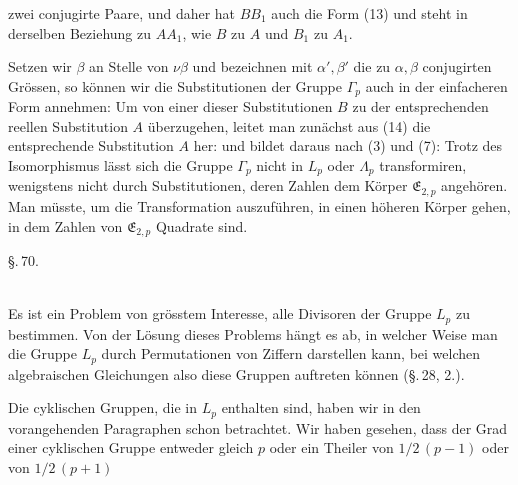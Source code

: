 zwei conjugirte Paare, und daher hat $BB_1$ auch die Form (13) und steht in derselben Beziehung zu $AA_1$, wie $B$ zu $A$ und $B_1$ zu $A_1$.


Setzen wir $\beta$ an Stelle von $\nu\beta$ und bezeichnen mit $\alpha', \beta'$ die zu $\alpha, \beta$ conjugirten Grössen, so können wir die Substitutionen der Gruppe $\Gamma_p$ auch in der einfacheren Form annehmen:
Um von einer dieser Substitutionen $B$ zu der entsprechenden reellen Substitution $A$ überzugehen, leitet man zunächst aus (14) die entsprechende Substitution $A$ her:
und bildet daraus nach (3) und (7):
Trotz des Isomorphismus lässt sich die Gruppe $\Gamma_p$ nicht in $L_p$ oder $\Lambda_p$ transformiren, wenigstens nicht durch Substitutionen, deren Zahlen dem Körper $\mathfrak{E}_{2,p}$ angehören. Man müsste, um die Transformation auszuführen, in einen höheren Körper gehen, in dem  Zahlen von $\mathfrak{E}_{2,p}$ Quadrate sind.

\begin{center}
\S.\,70.\\
\\
\end{center}

Es ist ein Problem von grösstem Interesse, alle Divisoren der Gruppe $L_p$ zu bestimmen. Von der Lösung dieses Problems hängt es ab, in welcher Weise man die Gruppe $L_p$ durch Permutationen von Ziffern darstellen kann, bei welchen algebraischen Gleichungen also diese Gruppen auftreten können (\S.\,28, 2.).

Die cyklischen Gruppen, die in $L_p$ enthalten sind, haben wir in den vorangehenden Paragraphen schon betrachtet. Wir haben gesehen, dass der Grad einer cyklischen Gruppe entweder gleich $p$ oder ein Theiler von $1/2\,(p-1)$ oder von $1/2\,(p+1)$
